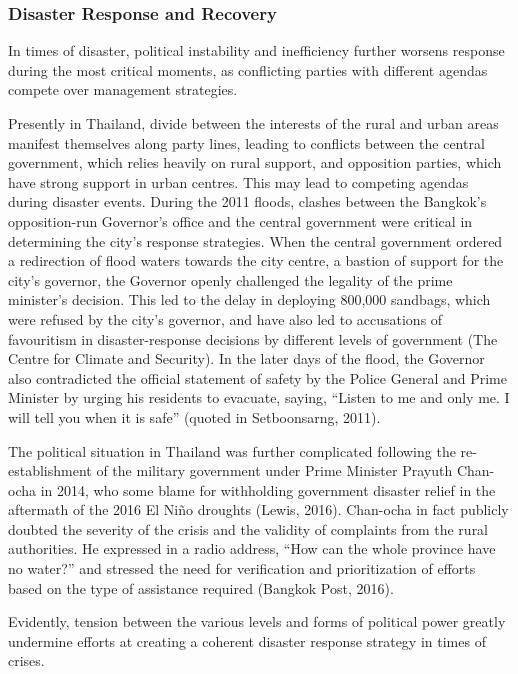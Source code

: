 \subsubsection{Disaster Response and Recovery}

In times of disaster, political instability and inefficiency further worsens response during the most critical moments, as conflicting parties with different agendas compete over management strategies. 

Presently in Thailand, divide between the interests of the rural and urban areas manifest themselves along party lines, leading to conflicts between the central government, which relies heavily on rural support, and opposition parties, which have strong support in urban centres. This may lead to competing agendas during disaster events. During the 2011 floods, clashes between the Bangkok's opposition-run Governor's office and the central government were critical in determining the city's response strategies. When the central government ordered a redirection of flood waters towards the city centre, a bastion of support for the city's governor, the Governor openly challenged the legality of the prime minister's decision. This led to the delay in deploying 800,000 sandbags, which were refused by the city's governor, and have also led to accusations of favouritism in disaster-response decisions by different levels of government (The Centre for Climate and Security). In the later days of the flood, the Governor also contradicted the official statement of safety by the Police General and Prime Minister by urging his residents to evacuate, saying, ``Listen to me and only me. I will tell you when it is safe'' (quoted in Setboonsarng, 2011).

The political situation in Thailand was further complicated following the re-establishment of the military government under Prime Minister Prayuth Chan-ocha in 2014, who some blame for withholding government disaster relief in the aftermath of the 2016 El Niño droughts (Lewis, 2016). Chan-ocha in fact publicly doubted the severity of the crisis and the validity of complaints from the rural authorities. He expressed in a radio address, ``How can the whole province have no water?'' and stressed the need for verification and prioritization of efforts based on the type of assistance required (Bangkok Post, 2016). 

Evidently, tension between the various levels and forms of political power greatly undermine efforts at creating a coherent disaster response strategy in times of crises.

